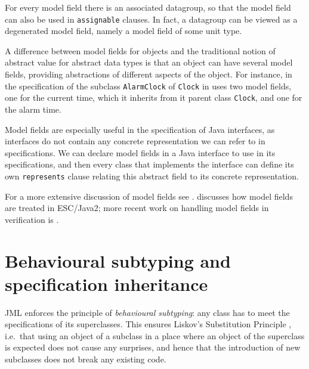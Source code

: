 \documentclass{llncs}
\begin{document}
For every model field there is an associated datagroup, so that the 
model field can also be used in \texttt{assignable} clauses.
In fact, a datagroup can be viewed as a degenerated model field, namely
a model field of some unit type.

A difference between model fields for objects and the traditional notion of
abstract value for abstract data types is that an object can have several
model fields, providing abstractions of different aspects of the object.
For instance, in the specification of the subclass \texttt{AlarmClock}
of \texttt{Clock} in  uses 
two model fields, one for the current time, which it inherits from
it parent class \texttt{Clock}, and one for the alarm time.

Model fields are especially useful in the specification of Java interfaces,
as interfaces do not contain any concrete representation we can refer
to in specifications. We can declare model fields in a Java interface
to use in its specifications, and then every class that implements 
the interface can define its own \texttt{represents} clause relating
this abstract field to its concrete representation. 


For a more extensive discussion of model fields see \cite{Cheon-etal05}.
\cite{Cok05} discusses how model fields are treated in ESC/Java2;
more recent work on handling model fields in verification is \cite{LeinoMuller06}.

\section{Behavioural subtyping and specification inheritance}
\label{Sec:behsubtyping}

JML enforces the principle of \emph{behavioural subtyping}: any class
has to meet the specifications of its superclasses.
This ensures Liskov's Substitution Principle \cite{LiskovWing94},
i.e.\ that using an object of a subclass in a place where an object of 
the superclass is expected does not cause any surprises, and hence that 
the introduction of new subclasses does not break any existing code.
\end{document}
